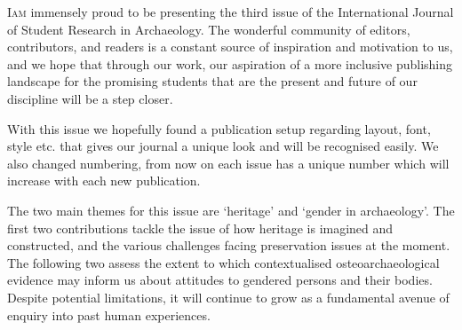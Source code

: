 \def\IJSRAidentifier{\currfilebase} %
\def\shorttitle{Issue Presentation}
\def\maintitle{Presentation of the third issue of IJSRA}
\def\cmail{gonzalo.linaresmatas@st-hughs.ox.ac.uk}
\def\authorone{Gonzalo Linares Matás}
\def\bioone{\href{https://oxford.academia.edu/GonzaloLinaresMatás}{\authorone}  has just finished a BA Archaeology \& Anthropology at St Hugh’s College, University of Oxford (UK). He is starting a Research Master’s in Human Evolution and Palaeolithic Archaeology at the University of Leiden (The Netherlands), focusing on vertebrate taphonomy, early bone technologies, and faunal analysis. He was the former President of the Oxford University Archaeology Society (Michaelmas 2015), and he has recently been invited to join the WAC (World Archaeology Congress) Student Committee. 

He is particularly interested in the socio-political contexts of heritage management and ownership, contemporary archaeological theory, and the histories of the academic disciplines of archaeology and anthropology as practical modes of inquiry. He is also very interested in transforming the academic publishing landscape.}
\def\affilone{Executive Editor, International Journal of Student Research in Archaeology
\\St. Hugh’s College, University of Oxford}


\IJSRAopening%
\lettrine{I}{am} immensely proud to be presenting the third issue of the International Journal of Student Research in Archaeology. The wonderful community of editors, contributors, and readers is a constant source of inspiration and motivation to us, and we hope that through our work, our aspiration of a more inclusive publishing landscape for the promising students that are the present and future of our discipline will be a step closer.

With this issue we hopefully found a publication setup regarding layout, font, style etc. that gives our journal a unique look and will be recognised easily. 
We also changed numbering, from now on each issue has a unique number which will increase with each new publication.


The two main themes for this issue are ‘heritage’ and ‘gender in archaeology’. The first two contributions tackle the issue of how heritage is imagined and constructed, and the various challenges facing preservation issues at the moment. The following two assess the extent to which contextualised osteoarchaeological evidence may inform us about attitudes to gendered persons and their bodies. Despite potential limitations, it will continue to grow as a fundamental avenue of enquiry into past human experiences.

